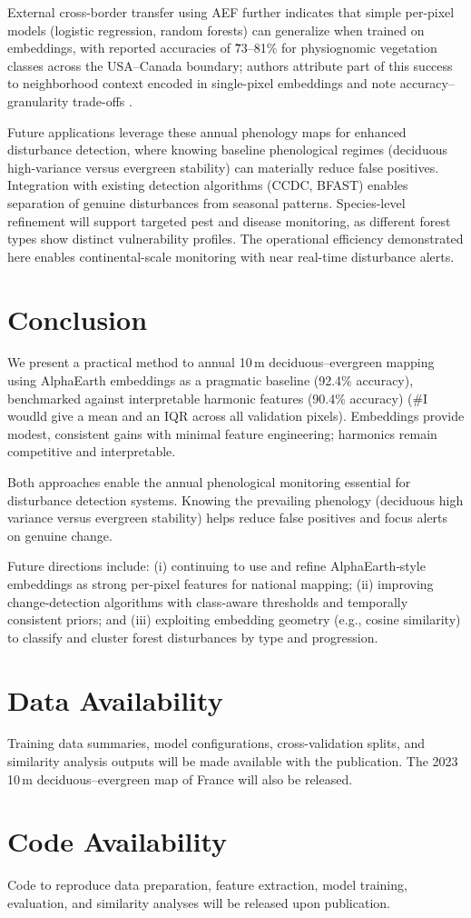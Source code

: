 \documentclass[utf8]{FrontiersinHarvard}
\begin{document}
External cross-border transfer using AEF further indicates that simple per-pixel models (logistic regression, random forests) can generalize when trained on embeddings, with reported accuracies of \~73–81\% for physiognomic vegetation classes across the USA–Canada boundary; authors attribute part of this success to neighborhood context encoded in single-pixel embeddings and note accuracy–granularity trade-offs \citep{Houriez2025AEFDataGen}.

Future applications leverage these annual phenology maps for enhanced disturbance detection, where knowing baseline phenological regimes (deciduous high-variance versus evergreen stability) can materially reduce false positives. Integration with existing detection algorithms (CCDC, BFAST) enables separation of genuine disturbances from seasonal patterns. Species-level refinement will support targeted pest and disease monitoring, as different forest types show distinct vulnerability profiles. The operational efficiency demonstrated here enables continental-scale monitoring with near real-time disturbance alerts.

\section{Conclusion}

We present a practical method to annual 10\,m deciduous–evergreen mapping using AlphaEarth embeddings as a pragmatic baseline (92.4\% accuracy), benchmarked against interpretable harmonic features (90.4\% accuracy) (#I woudld give a mean and an IQR across all validation pixels). Embeddings provide modest, consistent gains with minimal feature engineering; harmonics remain competitive and interpretable.

Both approaches enable the annual phenological monitoring essential for disturbance detection systems. Knowing the prevailing phenology (deciduous high variance versus evergreen stability) helps reduce false positives and focus alerts on genuine change.

Future directions include: (i) continuing to use and refine AlphaEarth‑style embeddings as strong per‑pixel features for national mapping; (ii) improving change‑detection algorithms with class‑aware thresholds and temporally consistent priors; and (iii) exploiting embedding geometry (e.g., cosine similarity) to classify and cluster forest disturbances by type and progression.

\section*{Data Availability}
Training data summaries, model configurations, cross-validation splits, and similarity analysis outputs will be made available with the publication. The 2023 10\,m deciduous–evergreen map of France will also be released.

\section*{Code Availability}
Code to reproduce data preparation, feature extraction, model training, evaluation, and similarity analyses will be released upon publication.



\end{document}
